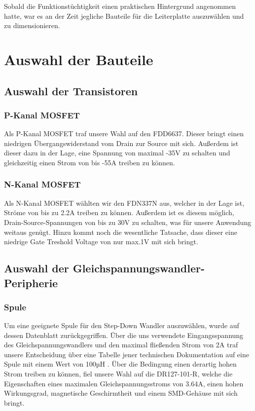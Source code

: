 Sobald die Funktionstüchtigkeit einen praktischen Hintergrund angenommen hatte,
war es an der Zeit jegliche Bauteile für die Leiterplatte auszuwählen und zu dimensionieren.


\newpage
\section{Auswahl der Bauteile}

\subsection{Auswahl der Transistoren}
\subsubsection{P-Kanal MOSFET}

Als P-Kanal MOSFET traf unsere Wahl auf den FDD6637.
Dieser bringt einen niedrigen Übergangswiderstand vom Drain zur Source mit sich.
Außerdem ist dieser dazu in der Lage, eine Spannung von maximal -35V zu schalten und gleichzeitig einen Strom von bis -55A treiben zu können.

\subsubsection{N-Kanal MOSFET}

Als N-Kanal MOSFET wählten wir den FDN337N aus, welcher in der Lage ist, Ströme von bis zu 2.2A treiben zu können.
Außerdem ist es diesem möglich, Drain-Source-Spannungen von bis zu 30V zu schalten, was für unsere Anwendung weitaus genügt.
Hinzu kommt noch die wesentliche Tatsache, dass dieser eine niedrige Gate Treshold Voltage von nur max.1V mit sich bringt.

\subsection{Auswahl der Gleichspannungswandler-Peripherie}

\subsubsection{Spule}
Um eine geeignete Spule für den Step-Down Wandler auszuwählen, wurde auf dessen Datenblatt zurückgegriffen.
Über die uns verwendete Eingangsspannung des Gleichspannungswandlers und den maximal fließenden Strom von 2A
traf unsere Entscheidung über eine Tabelle jener technischen Dokumentation auf eine Spule mit einem Wert von 100µH .
Über die Bedingung einen derartig hohen Strom treiben zu können, fiel unsere Wahl auf die DR127-101-R,
welche die Eigenschaften eines maximalen Gleichspannungsstroms von 3.64A, einen hohen Wirkungsgrad, magnetische Geschirmtheit und einem SMD-Gehäuse mit sich bringt.

